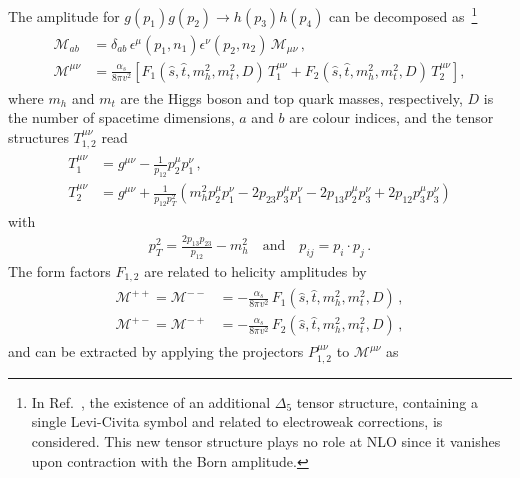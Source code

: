 The amplitude for $g(p_1) g(p_2) \to h(p_3) h(p_4)$ can be decomposed as~\cite{Glover:1987nx}\footnote{In Ref.~\cite{Bi:2023bnq}, the existence of an additional $\Delta_5$ tensor structure, containing a single Levi-Civita symbol and related to electroweak corrections, is considered. This new tensor structure plays no role at NLO since it vanishes upon contraction with the Born amplitude.}
\begin{align}
    \begin{aligned}
        \mathcal{M}_{ab}&=\delta_{ab}\,\epsilon^\mu (p_1,n_1)\epsilon^\nu (p_2,n_2)\,\mathcal{M}_{\mu\nu}   \,,\\
        \mathcal{M}^{\mu\nu}&=\frac{\alpha_s}{8\pi v^2}\left[
        F_1(\hat{s},\hat{t},m_h^2,m_t^2,D)\,T_1 ^{\mu\nu} +
        F_2(\hat{s},\hat{t},m_h^2,m_t^2,D)\,T_2 ^{\mu\nu}
        \right],
    \end{aligned}
    \label{eq:FFdeco}
\end{align}
where $m_h$ and $m_t$ are the Higgs boson and top quark masses, respectively, $D$ is the number of spacetime dimensions, $a$ and $b$ are colour indices, and the tensor structures $T_{1,2}^{\mu\nu}$ read
\begin{align}
    \begin{aligned}
        T_1^{\mu\nu} &= g^{\mu\nu} - \frac{1}{p_{12}}
        p_2^\mu p_1^\nu
        \,,\\
        T_2^{\mu\nu} &= g^{\mu\nu} + \frac{1}{p_{12} p_T^2}
    \left(
        m_h^2 p_2^\mu p_1^\nu - 2 p_{23} p_3^\mu p_1^\nu - 2 p_{13} p_2^\mu p_3^\nu + 2 p_{12} p_3^\mu p_3^\nu
    \right)
    \end{aligned}
\end{align}
with
\begin{align}
    p_T^2 = \frac{2 p_{13} p_{23}}{p_{12}} - m_h^2\quad\mbox{and}\quad p_{ij}=p_i\cdot p_j
    \,.
\end{align}
The form factors $F_{1,2}$ are related to helicity amplitudes by
\begin{align}
    \begin{aligned}
        \mathcal{M}^{++}    = \mathcal{M}^{--} &= -\frac{\alpha_s}{8\pi v^2} \,F_1(\hat{s},\hat{t},m_h^2,m_t^2,D) \,,\\
        \mathcal{M}^{+-}    = \mathcal{M}^{-+} &= -\frac{\alpha_s}{8\pi v^2} \,F_2(\hat{s},\hat{t},m_h^2,m_t^2,D)
        \,,
    \end{aligned}
\end{align}
and can be extracted by applying the projectors $P_{1,2}^{\mu\nu}$ to $\mathcal{M}^{\mu\nu}$ as

